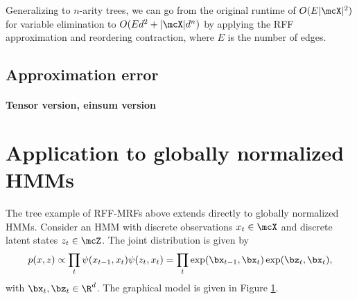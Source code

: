 \documentclass{article}
\begin{document}
Generalizing to $n$-arity trees, we can go from the original runtime of $O(E|\mcX|^2)$
for variable elimination to $O(Ed^2 + |\mcX|d^n)$ by applying the
RFF approximation and reordering contraction, where $E$ is the number of edges.

\subsection{Approximation error}

\paragraph{Tensor version, einsum version}

\section{Application to globally normalized HMMs}
The tree example of RFF-MRFs above extends directly to globally normalized HMMs.
Consider an HMM with discrete observations $x_t \in \mcX$
and discrete latent states $z_t\in\mcZ$.
The joint distribution is given by
\begin{equation}
p(x,z) \propto \prod_t \psi(x_{t-1}, x_t) \psi(z_t, x_t)
= \prod_t \exp(\bx_{t-1}, \bx_t) \exp(\bz_t, \bx_t),
\end{equation}
with $\bx_t,\bz_t\in\R^d$.
The graphical model is given in Figure \ref{fig:hmm}.
\begin{figure}[htb!]
\centering
{}
\caption{
\label{fig:hmm}
}
\end{figure}
\end{document}
